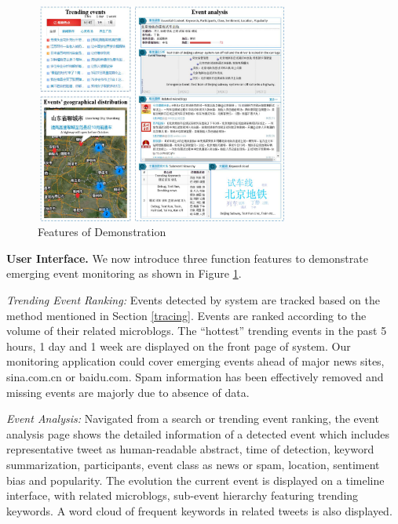 \makeatletter
\setlength{\@fptop}{0pt}
\makeatother

\begin{figure}[!t]
\centering
\includegraphics[width=3.3in, height=2.85in]{UI}
\caption{Features of Demonstration}
\label{fig:UI}
\end{figure}

\noindent\textbf{User Interface.}
We now introduce three function features to demonstrate emerging event monitoring as shown in Figure \ref{fig:UI}.

\emph{Trending Event Ranking:}
Events detected by \ring system are tracked based on the method mentioned in Section \ref{tracing}.
Events are ranked according to the volume of their related microblogs.
The ``hottest'' trending events in the past 5 hours, 1 day and 1 week are displayed on the front page of \ring system.
Our monitoring application could cover emerging events ahead of major news sites, \eg sina.com.cn or baidu.com.
Spam information has been effectively removed and missing events are majorly due to absence of data.

\emph{Event Analysis:}
Navigated from a search or trending event ranking, the event analysis page shows the detailed information of a detected event
which includes representative tweet as human-readable abstract, time of detection, keyword summarization, participants, event class as news or spam, location, sentiment bias and popularity.
The evolution the current event is displayed on a timeline interface, with related microblogs, sub-event hierarchy featuring trending keywords.
A word cloud of frequent keywords in related tweets is also displayed.

